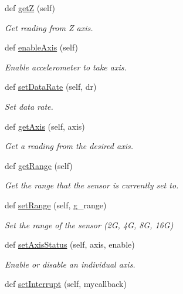 \begin{DoxyCompactItemize}
def \mbox{\hyperlink{classlis3dh_1_1_l_i_s3_d_h_a6750df0cbf304ab3594fcbeb2e691918}{getZ}} (self)
\begin{DoxyCompactList}\small\item\em Get reading from Z axis. \end{DoxyCompactList}\item 
def \mbox{\hyperlink{classlis3dh_1_1_l_i_s3_d_h_aba8abe98281f1b157eb892cd442aa49d}{enable\+Axis}} (self)
\begin{DoxyCompactList}\small\item\em Enable accelerometer to take axis. \end{DoxyCompactList}\item 
def \mbox{\hyperlink{classlis3dh_1_1_l_i_s3_d_h_a23a744eefeb3648a4c0efb91e1d2ce77}{set\+Data\+Rate}} (self, dr)
\begin{DoxyCompactList}\small\item\em Set data rate. \end{DoxyCompactList}\item 
def \mbox{\hyperlink{classlis3dh_1_1_l_i_s3_d_h_a951a886538397f6cea8daf47fd362582}{get\+Axis}} (self, axis)
\begin{DoxyCompactList}\small\item\em Get a reading from the desired axis. \end{DoxyCompactList}\item 
def \mbox{\hyperlink{classlis3dh_1_1_l_i_s3_d_h_a0e821b644781dbd2d75cbbe276a4c9cf}{get\+Range}} (self)
\begin{DoxyCompactList}\small\item\em Get the range that the sensor is currently set to. \end{DoxyCompactList}\item 
def \mbox{\hyperlink{classlis3dh_1_1_l_i_s3_d_h_ac12f8623e3535c7fa437e519ee1eb635}{set\+Range}} (self, g\+\_\+range)
\begin{DoxyCompactList}\small\item\em Set the range of the sensor (2G, 4G, 8G, 16G) \end{DoxyCompactList}\item 
def \mbox{\hyperlink{classlis3dh_1_1_l_i_s3_d_h_a5c1dbf97af7b1f8c7928e979935722cd}{set\+Axis\+Status}} (self, axis, enable)
\begin{DoxyCompactList}\small\item\em Enable or disable an individual axis. \end{DoxyCompactList}\item 
def \mbox{\hyperlink{classlis3dh_1_1_l_i_s3_d_h_ab70d7a59ae03af9d4291d856957e065e}{set\+Interrupt}} (self, mycallback)

\end{DoxyCompactItemize}
